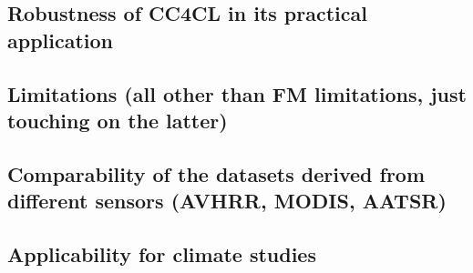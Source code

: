 \label{conclusions}
\subsection{Robustness of CC4CL in its practical application}
\subsection{Limitations (all other than FM limitations, just touching on the latter)}
\subsection{Comparability of the datasets derived from different sensors (AVHRR, MODIS, AATSR)}
\subsection{Applicability for climate studies}

